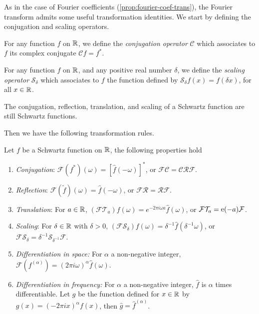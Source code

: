 As in the case of Fourier coefficients (\cref{prop:fourier-coef-trans}), the Fourier
transform admits some useful transformation identities. We start by defining the
conjugation and scaling operators.
\begin{definition}
	For any function $f$ on $\mathbb{R}$, we define the \emph{conjugation operator} $\mathcal{C}$
	which associates to $f$ its complex conjugate $\mathcal{C}f=f^*$.
\end{definition}
\begin{definition}
	For any function $f$ on $\mathbb{R}$, and any positive real number $\delta$, we define the
	\emph{scaling operator} $\mathcal{S}_{\delta}$ which associates to $f$ the function
	defined by $\mathcal{S}_{\delta}f(x)=f(\delta x)$, for all $x\in\mathbb{R}$.
\end{definition}
\begin{proposition}
	The conjugation, reflection, translation, and scaling of a Schwartz function are still
	Schwartz functions.
\end{proposition}
Then we have the following transformation rules.
\begin{proposition}
	\label{prop:ft-trans}
	Let $f$ be a Schwartz function on $\mathbb{R}$, the following properties hold
	\begin{enumerate}
		\item \emph{Conjugation}: $\mathcal{F}(f^*)(\omega)=[\hat{f}(-\omega)]^*$, or
		      $\mathcal{F}\mathcal{C}=\mathcal{C}\mathcal{R}\mathcal{F}$.
		\item \emph{Reflection}: $\mathcal{F}(\tilde{f})(\omega)=\hat{f}(-\omega)$, or
		      $\mathcal{F}\mathcal{R}=\mathcal{R}\mathcal{F}$.
		\item \emph{Translation}: For $a\in\mathbb{R}$, $(\mathcal{F}\mathcal{T}_{a})f(\omega)
			      =e^{-2\pi i\omega a}\hat{f}(\omega)$, or
		      $\mathcal{F}\mathcal{T}_{a}=\operatorname{e}(-a)\mathcal{F}$.
		\item \emph{Scaling}: For $\delta\in\mathbb{R}$ with $\delta>0$,
		      $(\mathcal{F}\mathcal{S}_{\delta})f(\omega)=\delta^{-1}\hat{f}(\delta^{-1}\omega)$,
		      or
		      $\mathcal{F}\mathcal{S}_{\delta}=\delta^{-1}\mathcal{S}_{\delta^{-1}}\mathcal{F}$.
		\item \emph{Differentiation in space:} For $\alpha$ a non-negative integer,
		      $\mathcal{F}(f^{(\alpha )})=(2\pi i\omega)^{\alpha}\hat{f}(\omega)$.
		\item \emph{Differentiation in frequency:} For $\alpha$ a non-negative integer,
		      $\hat{f}$ is $\alpha$ times differentiable. Let $g$ be the function defined for
		      $x\in\mathbb{R}$ by $g(x)=(-2\pi ix)^\alpha f(x)$, then $\hat{g}=\hat{f}^{(\alpha)}$.
	\end{enumerate}
\end{proposition}
